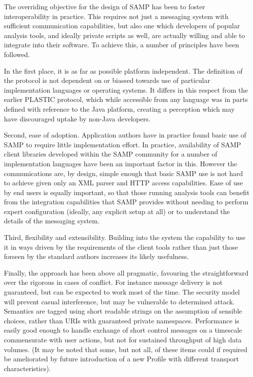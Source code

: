 \documentclass[5p]{elsarticle}
\begin{document}
The overriding objective for the design of SAMP
has been to foster interoperability in practice.
This requires not just a messaging system with sufficient communication
capabilities, but also one which developers of popular analysis tools,
and ideally private scripts as well,
are actually willing and able to integrate into their software.
To achieve this, a number of principles
have been followed.

In the first place, it is as far as possible platform independent.
The definition of the protocol is not dependent on or biassed
towards use of particular implementation languages or operating systems.
It differs in this respect from the earlier PLASTIC protocol,
which while accessible from any language was in parts defined with
reference to the Java platform, creating a perception which may
have discouraged uptake by non-Java developers.

Second, ease of adoption.
Application authors have in practice found basic use of 
SAMP to require little implementation effort.
In practice, availability of SAMP client libraries
developed within the SAMP community
for a number of implementation languages have been an important
factor in this.
However the communications are, by design, simple enough that
basic SAMP use is not hard to achieve given only an XML parser
and HTTP access capabilities.
Ease of use by end users is equally important,
so that those running analysis tools
can benefit from the integration capabilities that SAMP provides
without needing to perform expert configuration
(ideally, any explicit setup at all) or to understand the details
of the messaging system.

Third, flexibility and extensibility.
Building into the system the capability to use it in ways
driven by the requirements of the client tools rather than
just those forseen by the standard authors increases its likely usefulness.

Finally, the approach has been above all pragmatic, favouring
the straightforward over the rigorous in cases of conflict.
For instance message delivery is not guaranteed, but can be 
expected to work most of the time.
The security model will prevent casual interference,
but may be vulnerable to determined attack.
Semantics are tagged
using short readable strings on the assumption of sensible choices,
rather than URIs with guaranteed private namespaces.
Performance is easily good enough to handle exchange of short control
messages on a timescale commensurate with user actions,
but not for sustained throughput of high data volumes.
(It may be noted that some, but not all,
of these items could if required be ameliorated by future
introduction of a new Profile with different transport characteristics).
\end{document}
